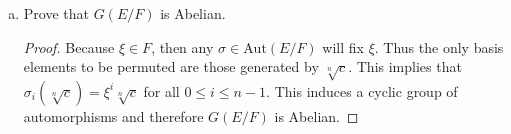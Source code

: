 \documentclass[12pt]{article}
\begin{document}
\begin{enumerate}
\begin{enumerate}[(a)]
\begin{proof}
                        $\delta=\xi^m\sqrt[n]{c}$ to $F$, we obtain all the
                        terms needed to generate all $n$ roots of the
                        polynomial. And so $x^n-c$ splits in $F(\delta)$.  
                    \end{proof}
                \item Prove that $G(E/F)$ is Abelian. 
                    \begin{proof}
                        Because $\xi\in F$, then any $\sigma\in\text{Aut}(E/F)$
                        will fix $\xi$. Thus the only basis elements to be
                        permuted are those generated by $\sqrt[n]{c}$. This
                        implies that $\sigma_i(\sqrt[n]{c})=\xi^i\sqrt[n]{c}$
                        for all $0\leq i\leq n-1$. This induces a cyclic group
                        of automorphisms and therefore $G(E/F)$ is Abelian. 
                    \end{proof}
            \end{enumerate}
    \end{enumerate}
\end{document}
